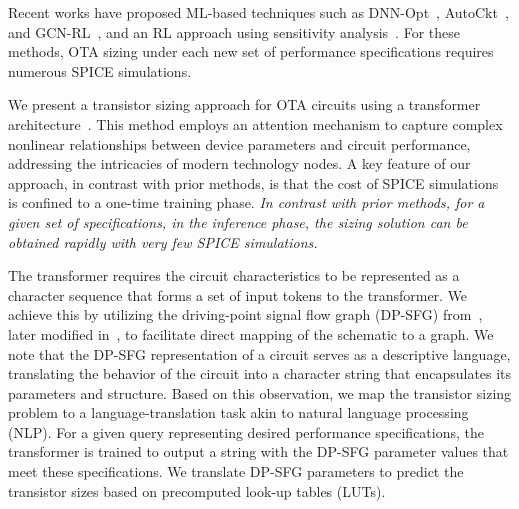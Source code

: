 Recent works have proposed ML-based techniques such as DNN-Opt~\cite{budak_21}, AutoCkt~\cite{settaluri_20}, and GCN-RL~\cite{Wang_2020}, and an RL approach using
sensitivity analysis~\cite{choi_23}. 
For these methods, OTA sizing under each new set of performance specifications  requires numerous SPICE simulations.

We present a transistor sizing approach for OTA circuits using a transformer architecture~\cite{vaswani_17}. This method employs an attention mechanism to capture complex nonlinear relationships between device parameters and circuit performance, addressing the intricacies of modern technology nodes. A key feature of our approach, in contrast with prior methods, is that the cost of SPICE simulations is confined to a one-time training phase. \textit{In contrast with prior methods, for a given set of specifications, in the inference phase, the sizing solution can be obtained rapidly with very few SPICE simulations.}

The transformer requires the circuit characteristics to be represented as a character sequence that forms a set of input tokens to the transformer. We achieve this by utilizing the driving-point signal flow graph (DP-SFG) from~\cite{ochoa_98}, later modified in~\cite{schmid_18}, to facilitate direct mapping of the schematic to a graph. We note that the DP-SFG representation of a circuit serves as a descriptive language, translating the behavior of the circuit into a character string that encapsulates its parameters and structure. Based on this observation, we map the transistor sizing problem to a language-translation task akin to natural language processing (NLP). For a given query representing desired performance specifications, the transformer is trained to output a string with the DP-SFG parameter values that meet these specifications. We translate DP-SFG parameters to predict the transistor sizes based on precomputed look-up tables (LUTs). 

